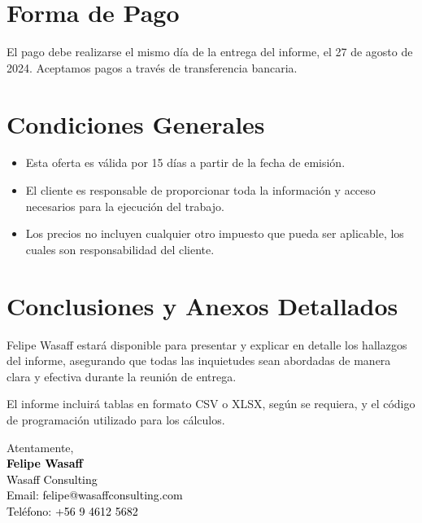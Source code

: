 \documentclass[a4paper,12pt]{article}
\begin{document}
\section*{Forma de Pago}

El pago debe realizarse el mismo día de la entrega del informe, el 27 de agosto de 2024. Aceptamos pagos a través de transferencia bancaria.

\section*{Condiciones Generales}

\begin{itemize}
    \item Esta oferta es válida por 15 días a partir de la fecha de emisión.
    \item El cliente es responsable de proporcionar toda la información y acceso necesarios para la ejecución del trabajo.
    \item Los precios no incluyen cualquier otro impuesto que pueda ser aplicable, los cuales son responsabilidad del cliente.
\end{itemize}

\section*{Conclusiones y Anexos Detallados}

Felipe Wasaff estará disponible para presentar y explicar en detalle los hallazgos del informe, asegurando que todas las inquietudes sean abordadas de manera clara y efectiva durante la reunión de entrega.

El informe incluirá tablas en formato CSV o XLSX, según se requiera, y el código de programación utilizado para los cálculos.

\vfill
\noindent
Atentamente,\\[2em]
\textbf{\textcolor{black}{Felipe Wasaff}}\\
\textcolor{black}{Wasaff Consulting}\\
\textcolor{black}{Email: felipe@wasaffconsulting.com}\\
\textcolor{black}{Teléfono: +56 9 4612 5682}
\end{document}

